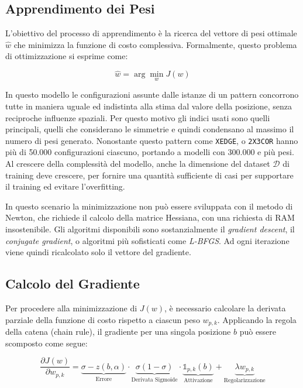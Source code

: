 \subsection{Apprendimento dei Pesi}

L'obiettivo del processo di apprendimento è la ricerca del vettore di pesi ottimale $\hat{w}$ che minimizza la funzione di costo complessiva. Formalmente, questo problema di ottimizzazione si esprime come:

\begin{equation}
    \hat{w} = \arg\min_{w} J(w)
\end{equation}

In questo modello le configurazioni assunte dalle istanze di un pattern concorrono tutte in maniera uguale ed indistinta alla stima dal valore della posizione, senza reciproche influenze spaziali.
Per questo motivo gli indici usati sono quelli principali, quelli che considerano le simmetrie e quindi condensano al massimo il numero di pesi generato.
Nonostante questo pattern come \texttt{XEDGE}, o \texttt{2X3COR} hanno più di 50.000 configurazioni ciascuno, portando a modelli con 300.000 e più pesi.
Al crescere della complessità del modello, anche la dimensione del dataset $\mathcal{D}$ di training deve crescere, per fornire una quantità sufficiente di casi per supportare il training ed evitare l'overfitting.

In questo scenario la minimizzazione non può essere sviluppata con il metodo di Newton, che richiede il calcolo della matrice Hessiana, con una richiesta di RAM insostenibile.
Gli algoritmi disponibili sono sostanzialmente il \textit{gradient descent}, il \textit{conjugate gradient}, o algoritmi più sofisticati come \textit{L-BFGS}.
Ad ogni iterazione viene quindi ricalcolato solo il vettore del gradiente.

\subsection{Calcolo del Gradiente}

Per procedere alla minimizzazione di $J(w)$, è necessario calcolare la derivata parziale della funzione di costo rispetto a ciascun peso $w_{p,k}$. Applicando la regola della catena (chain rule), il gradiente per una singola posizione $b$ può essere scomposto come segue:

\begin{equation}
    \frac{\partial J(w)}{\partial w_{p,k}} = \underbrace{\sigma - z(b, \alpha)}_{\text{Errore}} \cdot \underbrace{\sigma(1 - \sigma)}_{\text{Derivata Sigmoide}} \cdot \underbrace{\mathbb{1}_{p,k}(b)}_{\text{Attivazione}} + \underbrace{\lambda w_{p,k}}_{\text{Regolarizzazione}}
\end{equation}

